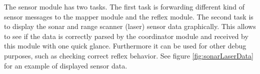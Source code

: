 The sensor module has two tasks. The first task is forwarding different kind of 
sensor messages to the mapper module and the reflex module. The second task is to
display the sonar and range scanner (laser) sensor data graphically. This allows 
to see if the data is correctly parsed by the coordinator module and received by 
this module with one quick glance. Furthermore it can be used for other debug 
purposes, such as checking correct reflex behavior. See figure \ref{fig:sonarLaserData}
for an example of displayed sensor data. 


